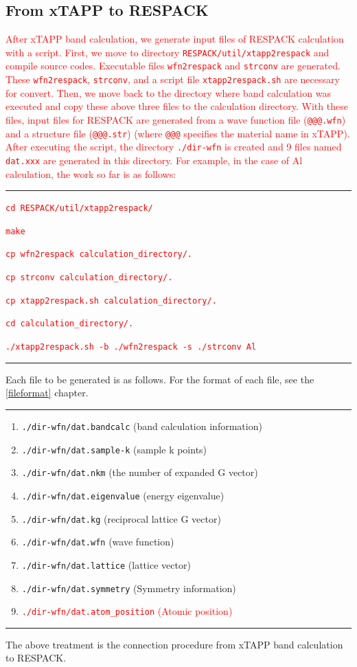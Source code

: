 \documentclass{article}
\newcommand{\tr}[1]{\textcolor{red}{#1}}
\begin{document}
\subsection{\label{xtapp2respack}From xTAPP to RESPACK}

\tr{After {\sc xTAPP} band calculation, we generate input files of RESPACK calculation with a script. First, we move to directory {\tt RESPACK/util/xtapp2respack} and compile source codes. Executable files {\tt wfn2respack} and {\tt strconv} are generated. These {\tt wfn2respack}, {\tt strconv}, and a script file {\tt xtapp2respack.sh} are necessary for convert. Then, we move back to the directory where band calculation was executed and copy these above three files to the calculation directory. With these files, input files for RESPACK are generated from a wave function file ({\tt @@@.wfn}) and a structure file ({\tt @@@.str}) (where {\tt @@@} specifies the material name in {\sc xTAPP}). After executing the script, the directory {\tt ./dir-wfn} is created and 9 files named {\tt dat.xxx} are generated in this directory. For example, in the case of Al calculation, the work so far is as follows:} 
\vspace{3mm}\hrule\vspace{3mm}
\tr{\texttt{cd RESPACK/util/xtapp2respack/}}

\tr{\texttt{make}} 

\tr{\texttt{cp wfn2respack calculation\_directory/.}}

\tr{\texttt{cp strconv calculation\_directory/.}}

\tr{\texttt{cp xtapp2respack.sh calculation\_directory/.}} 

\tr{\texttt{cd calculation\_directory/.}}

\tr{\texttt{./xtapp2respack.sh -b ./wfn2respack -s ./strconv Al}}
\vspace{3mm}\hrule\vspace{3mm}
Each file to be generated is as follows. For the format of each file, see the \ref{fileformat} chapter.
\vspace{3mm}\hrule
\begin{enumerate}
\item \verb+./dir-wfn/dat.bandcalc+ (band calculation information)
\item \verb+./dir-wfn/dat.sample-k+ (sample k points)
\item \verb+./dir-wfn/dat.nkm+ (the number of expanded G vector)
\item \verb+./dir-wfn/dat.eigenvalue+ (energy eigenvalue)
\item \verb+./dir-wfn/dat.kg+ (reciprocal lattice G vector)
\item \verb+./dir-wfn/dat.wfn+ (wave function)
\item \verb+./dir-wfn/dat.lattice+ (lattice vector)
\item \verb+./dir-wfn/dat.symmetry+ (Symmetry information)
\item \tr{{\tt ./dir-wfn/dat.atom\_position} (Atomic position)}
\end{enumerate}
\hrule\vspace{3mm}
The above treatment is the connection procedure from {\sc xTAPP} band calculation to RESPACK.
\end{document}
